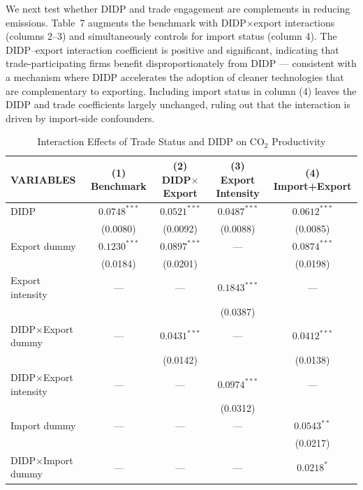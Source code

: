 \documentclass[11pt,a4paper]{article}
\begin{document}
We next test whether DIDP and trade engagement are complements in reducing emissions. Table~7 augments the benchmark with DIDP$\times$export interactions (columns 2--3) and simultaneously controls for import status (column 4). The DIDP--export interaction coefficient is positive and significant, indicating that trade-participating firms benefit disproportionately from DIDP --- consistent with a mechanism where DIDP accelerates the adoption of cleaner technologies that are complementary to exporting. Including import status in column (4) leaves the DIDP and trade coefficients largely unchanged, ruling out that the interaction is driven by import-side confounders.

\begin{table}[htbp]
\centering
\caption{Interaction Effects of Trade Status and DIDP on CO$_2$ Productivity}
\label{tab:interaction}
\begin{tabular}{lcccc}
\toprule
VARIABLES & (1) Benchmark & (2) DIDP$\times$Export & (3) Export Intensity & (4) Import+Export \\
\midrule
DIDP                     & $0.0748^{***}$ & $0.0521^{***}$ & $0.0487^{***}$ & $0.0612^{***}$ \\
                         & (0.0080) & (0.0092) & (0.0088) & (0.0085) \\
Export dummy             & $0.1230^{***}$ & $0.0897^{***}$ & ---      & $0.0874^{***}$ \\
                         & (0.0184) & (0.0201) &          & (0.0198) \\
Export intensity         & ---      & ---      & $0.1843^{***}$ & --- \\
                         &          &          & (0.0387) & \\
DIDP$\times$Export dummy & ---      & $0.0431^{***}$ & ---      & $0.0412^{***}$ \\
                         &          & (0.0142) &          & (0.0138) \\
DIDP$\times$Export intensity & ---  & ---      & $0.0974^{***}$ & --- \\
                         &          &          & (0.0312) & \\
Import dummy             & ---      & ---      & ---      & $0.0543^{**}$ \\
                         &          &          &          & (0.0217) \\
DIDP$\times$Import dummy & ---      & ---      & ---      & $0.0218^{*}$ \\

\end{tabular}
\end{table}
\end{document}
